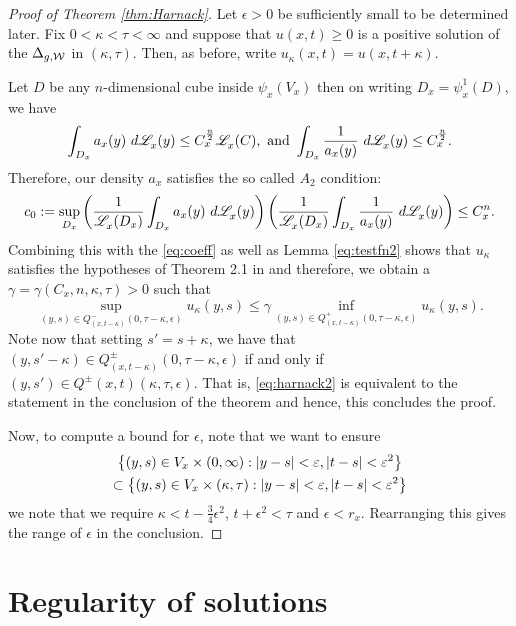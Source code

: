 \documentclass[a4paper, 12pt]{amsart}
\begin{document}
\begin{proof}[Proof of Theorem \ref{thm:Harnack}]
Let $\epsilon > 0$ be sufficiently small to 
be determined later. 
Fix $0 < \kappa < \tau < \infty$ and suppose that $u(x,t) \geq 0$ 
is a positive solution of
the $\Delta_{g,\mathcal{W}}$ in $(\kappa,\tau)$. 
Then, as before, write $u_\kappa(x,t) = u(x,t+\kappa)$.

Let $D$ be any $n$-dimensional cube inside $\psi_x(V_x)$ then 
on writing $D_x = \psi_x^{1}(D)$, we have  
$$ \int_{D_x} a_x(y)\ d\Leb_x(y) \leq C_x^{\frac{n}{2}} \Leb_x(C),
\ \text{and}\ 
\int_{D_x} \frac{1}{a_x(y)}\ d\Leb_x(y) \leq C_x^{\frac{n}{2}}.$$
Therefore, our density $a_x$ satisfies the so called $A_2$ condition:
$$c_0 := \sup_{D_x} \left( \frac{1}{\mathscr{L}^{{}}_x(D_x)} \int_{D_x} a_x(y)\ d\mathscr{L}^{{}}_x(y)\right)
\left( \frac{1}{\mathscr{L}^{{}}_x(D_x)} \int_{D_x} \frac{1}{a_x(y)}\ d\mathscr{L}^{{}}_x(y)\right) 
	\leq C_x^n.$$
Combining this with the \eqref{eq:coeff} as
well as Lemma \eqref{eq:testfn2} shows that $u_\kappa$
satisfies the hypotheses of Theorem 2.1 in \cite{CS} and
therefore, we obtain a $\gamma = \gamma(C_x, n, \kappa, \tau) > 0$
such that 
\begin{equation} 
\label{eq:harnack2} 
\sup_{(y,s) \in Q_{(x,t-\kappa)}^-(0, \tau - \kappa, \epsilon)} u_\kappa(y,s)
		\leq \gamma \inf_{(y,s) \in Q^+_{(x,t-\kappa)}(0, \tau - \kappa, \epsilon)} u_\kappa(y,s).
\end{equation}
Note now that setting $s' = s + \kappa$, we have that
$(y, s' - \kappa) \in Q^{\pm}_{(x,t- \kappa)}(0, \tau - \kappa, \epsilon)$
if and only if $(y, s') \in Q^{\pm}(x,t)(\kappa, \tau, \epsilon)$.
That is, \eqref{eq:harnack2} is equivalent to the statement 
in the conclusion of the theorem and hence, this concludes
the proof.

Now, to compute a bound for $\epsilon$, note that
we want to ensure 
\begin{multline*}\left\{(y,s) \in V_x \times (0, \infty): |y - s| < \varepsilon, |t - s| < \varepsilon^2\right\} \\
\subset \left\{(y,s) \in V_x \times (\kappa, \tau): |y - s| < \varepsilon, |t - s| < \varepsilon^2\right\}
\end{multline*} 
we note that we require $\kappa < t - \frac{3}{4} \epsilon^2$,
$t + \epsilon^2 < \tau$ and $\epsilon < r_x$.
Rearranging this gives the range of $\epsilon$
in the conclusion.
\end{proof} 

\section{Regularity of solutions}
\end{document}
